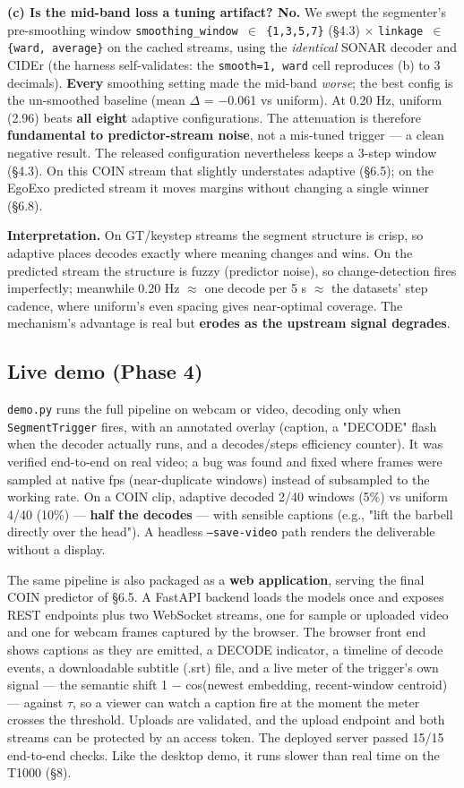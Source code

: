 \textbf{(c) Is the mid-band loss a tuning artifact? No.} We swept the segmenter's pre-smoothing window \texttt{smoothing\_window $\in$ \{1,3,5,7\}} (\S4.3) $\times$ \texttt{linkage $\in$ \{ward, average\}} on the cached streams, using the \emph{identical} SONAR decoder and CIDEr (the harness self-validates: the \texttt{smooth=1, ward} cell reproduces (b) to 3 decimals). \textbf{Every} smoothing setting made the mid-band \emph{worse}; the best config is the un-smoothed baseline (mean $\Delta$ = $-$0.061 vs uniform). At 0.20 Hz, uniform (2.96) beats \textbf{all eight} adaptive configurations. The attenuation is therefore \textbf{fundamental to predictor-stream noise}, not a mis-tuned trigger --- a clean negative result. The released configuration nevertheless keeps a 3-step window (\S4.3). On this COIN stream that slightly understates adaptive (\S6.5); on the EgoExo predicted stream it moves margins without changing a single winner (\S6.8).

\textbf{Interpretation.} On GT/keystep streams the segment structure is crisp, so adaptive places decodes exactly where meaning changes and wins. On the predicted stream the structure is fuzzy (predictor noise), so change-detection fires imperfectly; meanwhile 0.20 Hz $\approx$ one decode per 5 s $\approx$ the datasets' step cadence, where uniform's even spacing gives near-optimal coverage. The mechanism's advantage is real but \textbf{erodes as the upstream signal degrades}.

\subsection{Live demo (Phase 4)}

\texttt{demo.py} runs the full pipeline on webcam or video, decoding only when \texttt{SegmentTrigger} fires, with an annotated overlay (caption, a "DECODE" flash when the decoder actually runs, and a decodes/steps efficiency counter). It was verified end-to-end on real video; a bug was found and fixed where frames were sampled at native fps (near-duplicate windows) instead of subsampled to the working rate. On a COIN clip, adaptive decoded 2/40 windows (5\%) vs uniform 4/40 (10\%) --- \textbf{half the decodes} --- with sensible captions (e.g., "lift the barbell directly over the head"). A headless \texttt{--save-video} path renders the deliverable without a display.

The same pipeline is also packaged as a \textbf{web application}, serving the final COIN predictor of \S6.5. A FastAPI backend loads the models once and exposes REST endpoints plus two WebSocket streams, one for sample or uploaded video and one for webcam frames captured by the browser. The browser front end shows captions as they are emitted, a DECODE indicator, a timeline of decode events, a downloadable subtitle (.srt) file, and a live meter of the trigger's own signal --- the semantic shift 1 $-$ cos(newest embedding, recent-window centroid) --- against $\tau$, so a viewer can watch a caption fire at the moment the meter crosses the threshold. Uploads are validated, and the upload endpoint and both streams can be protected by an access token. The deployed server passed 15/15 end-to-end checks. Like the desktop demo, it runs slower than real time on the T1000 (\S8).

